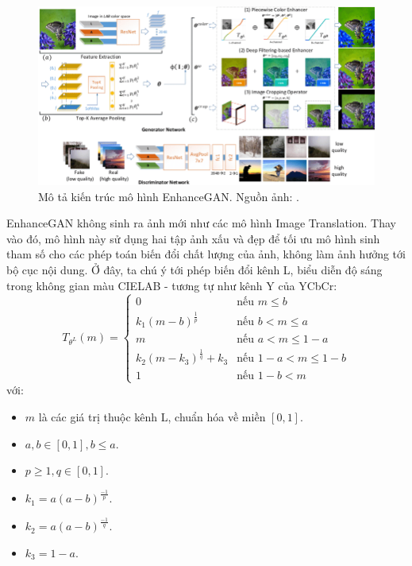 \documentclass[12pt]{extreport}
\begin{document}
\begin{figure}[H]
    \centering
    \includegraphics[width=.9\linewidth]{figure44.png}
    \caption{Mô tả kiến trúc mô hình EnhanceGAN. Nguồn ảnh: \cite{DBLP:journals/corr/DengLT17}.}
\end{figure}

EnhanceGAN không sinh ra ảnh mới như các mô hình Image Translation. Thay vào đó, mô hình này sử dụng hai tập ảnh xấu và đẹp để tối ưu mô hình sinh tham số cho các phép toán biến đổi chất lượng của ảnh, không làm ảnh hưởng tới bộ cục nội dung. Ở đây, ta chú ý tới phép biến đổi kênh L, biểu diễn độ sáng trong không gian màu CIELAB - tương tự như kênh Y của YCbCr:
$$
    T_{\theta^L}(m) = \begin{cases}
        0                                 & \text{nếu } m \leq b             \\
        k_1 (m - b)^{\frac{1}{p}}         & \text{nếu } b < m \leq a         \\
        m                                 & \text{nếu } a < m \leq 1 - a     \\
        k_2 (m - k_3)^{\frac{1}{q}} + k_3 & \text{nếu } 1 - a < m \leq 1 - b \\
        1                                 & \text{nếu } 1 - b < m
    \end{cases}
$$
với:
\begin{itemize}
    \item $ m $ là các giá trị thuộc kênh L, chuẩn hóa về miền $ [0, 1] $.
    \item $ a, b \in [0, 1], b \leq a $.
    \item $ p \geq 1, q \in [0, 1] $.
    \item $ k_1 = a(a - b)^{\frac{-1}{p}} $.
    \item $ k_2 = a(a - b)^{\frac{-1}{q}} $.
    \item $ k_3 = 1 - a $.
\end{itemize}
\end{document}
